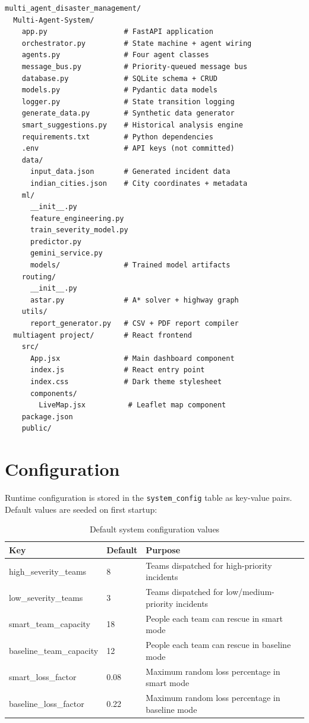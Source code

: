 \begin{lstlisting}[style=pseudocode, caption=Project directory structure]
multi_agent_disaster_management/
  Multi-Agent-System/
    app.py                  # FastAPI application
    orchestrator.py         # State machine + agent wiring
    agents.py               # Four agent classes
    message_bus.py          # Priority-queued message bus
    database.py             # SQLite schema + CRUD
    models.py               # Pydantic data models
    logger.py               # State transition logging
    generate_data.py        # Synthetic data generator
    smart_suggestions.py    # Historical analysis engine
    requirements.txt        # Python dependencies
    .env                    # API keys (not committed)
    data/
      input_data.json       # Generated incident data
      indian_cities.json    # City coordinates + metadata
    ml/
      __init__.py
      feature_engineering.py
      train_severity_model.py
      predictor.py
      gemini_service.py
      models/               # Trained model artifacts
    routing/
      __init__.py
      astar.py              # A* solver + highway graph
    utils/
      report_generator.py   # CSV + PDF report compiler
  multiagent project/       # React frontend
    src/
      App.jsx               # Main dashboard component
      index.js              # React entry point
      index.css             # Dark theme stylesheet
      components/
        LiveMap.jsx          # Leaflet map component
    package.json
    public/
\end{lstlisting}

\section{Configuration}
\label{sec:impl_config}

Runtime configuration is stored in the \texttt{system\_config} table as key-value pairs. Default values are seeded on first startup:

\begin{table}[H]
\centering
\caption{Default system configuration values}
\label{tab:config_values}
\begin{tabular}{|l|l|l|}
\hline
\textbf{Key} & \textbf{Default} & \textbf{Purpose} \\
\hline
high\_severity\_teams & 8 & Teams dispatched for high-priority incidents \\
\hline
low\_severity\_teams & 3 & Teams dispatched for low/medium-priority incidents \\
\hline
smart\_team\_capacity & 18 & People each team can rescue in smart mode \\
\hline
baseline\_team\_capacity & 12 & People each team can rescue in baseline mode \\
\hline
smart\_loss\_factor & 0.08 & Maximum random loss percentage in smart mode \\
\hline
baseline\_loss\_factor & 0.22 & Maximum random loss percentage in baseline mode \\
\hline
\end{tabular}
\end{table}

